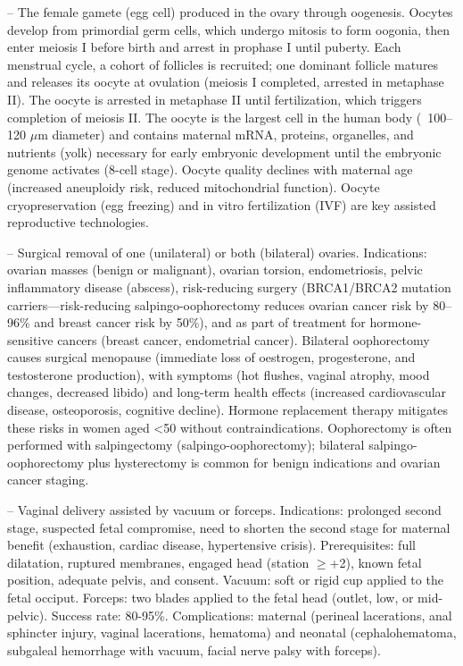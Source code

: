 -- The female gamete (egg cell) produced in the ovary through oogenesis. Oocytes develop from primordial germ cells, which undergo mitosis to form oogonia, then enter meiosis I before birth and arrest in prophase I until puberty. Each menstrual cycle, a cohort of follicles is recruited; one dominant follicle matures and releases its oocyte at ovulation (meiosis I completed, arrested in metaphase II). The oocyte is arrested in metaphase II until fertilization, which triggers completion of meiosis II. The oocyte is the largest cell in the human body (~100--120 \(\mu\)m diameter) and contains maternal mRNA, proteins, organelles, and nutrients (yolk) necessary for early embryonic development until the embryonic genome activates (8-cell stage). Oocyte quality declines with maternal age (increased aneuploidy risk, reduced mitochondrial function). Oocyte cryopreservation (egg freezing) and in vitro fertilization (IVF) are key assisted reproductive technologies.

-- Surgical removal of one (unilateral) or both (bilateral) ovaries. Indications: ovarian masses (benign or malignant), ovarian torsion, endometriosis, pelvic inflammatory disease (abscess), risk-reducing surgery (BRCA1/BRCA2 mutation carriers—risk-reducing salpingo-oophorectomy reduces ovarian cancer risk by 80--96\% and breast cancer risk by 50\%), and as part of treatment for hormone-sensitive cancers (breast cancer, endometrial cancer). Bilateral oophorectomy causes surgical menopause (immediate loss of oestrogen, progesterone, and testosterone production), with symptoms (hot flushes, vaginal atrophy, mood changes, decreased libido) and long-term health effects (increased cardiovascular disease, osteoporosis, cognitive decline). Hormone replacement therapy mitigates these risks in women aged <50 without contraindications. Oophorectomy is often performed with salpingectomy (salpingo-oophorectomy); bilateral salpingo-oophorectomy plus hysterectomy is common for benign indications and ovarian cancer staging.

-- Vaginal delivery assisted by vacuum or forceps. Indications: prolonged second stage, suspected fetal compromise, need to shorten the second stage for maternal benefit (exhaustion, cardiac disease, hypertensive crisis). Prerequisites: full dilatation, ruptured membranes, engaged head (station \(\ge\)+2), known fetal position, adequate pelvis, and consent. Vacuum: soft or rigid cup applied to the fetal occiput. Forceps: two blades applied to the fetal head (outlet, low, or mid-pelvic). Success rate: 80-95\%. Complications: maternal (perineal lacerations, anal sphincter injury, vaginal lacerations, hematoma) and neonatal (cephalohematoma, subgaleal hemorrhage with vacuum, facial nerve palsy with forceps).

